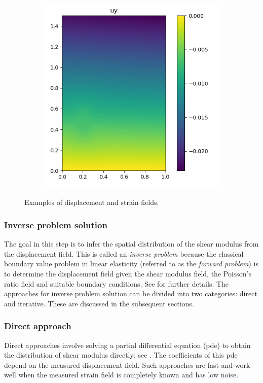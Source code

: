 \documentclass[12pt]{article}
\begin{document}
\begin{figure}[h]
\begin{subfigure}[b]{0.25\linewidth}
  \end{subfigure}
  \begin{subfigure}[b]{0.25\linewidth}
    \includegraphics[totalheight=4cm]{Figures/dispstrainfields/uy11_fypy.png}
  \end{subfigure}
  \caption{\label{fig:exampdispstrain} Examples of displacement and strain fields.}
\end{figure}
\subsubsection{Inverse problem solution} The goal in this step is to infer the spatial distribution of the shear modulus from the displacement field. This is called an \textit{inverse problem} because the classical boundary value problem in linear elasticity (referred to as the \textit{forward problem}) is to determine the displacement field given the shear modulus field, the Poisson's ratio field and suitable boundary conditions. See \cite{book:hugheslinear,book:fishbelytschko} for further details. The approaches for inverse problem solution can be divided into two categories: direct and iterative. These are discussed in the subsequent sections.
\subsubsection{Direct approach} Direct approaches involve solving a partial differential equation (pde) to obtain the distribution of shear modulus directly: see \cite{paper:raghavan1994,paper:barboneadjwt,paper:albocher}. The coefficients of this pde depend on the measured displacement field. Such approaches are fast and work well when the measured strain field is completely known and has low noise.
\end{document}
